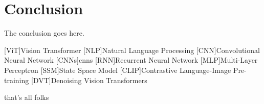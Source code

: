 \documentclass[conference]{IEEEtran}
\begin{document}
  \section{Conclusion}
  The conclusion goes here.

  \printbibliography

  \begin{acronym}
    [ViT]{Vision Transformer}
    [NLP]{Natural Language Processing}
    [CNN]{Convolutional Neural Network}
    [CNNs]{\acp{cnn}}
    [RNN]{Recurrent Neural Network}
    [MLP]{Multi-Layer Perceptron}
    [SSM]{State Space Model}
    [CLIP]{Contrastive Language-Image Pre-training}
    [DVT]{Denoising Vision Transformers}
  \end{acronym}


that's all folks
\end{document}
